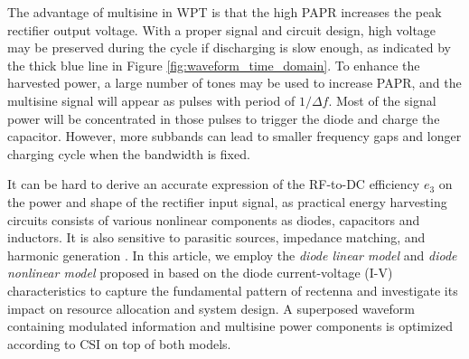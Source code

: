 The advantage of multisine in WPT is that the high PAPR increases the peak rectifier output voltage. With a proper signal and circuit design, high voltage may be preserved during the cycle if discharging is slow enough, as indicated by the thick blue line in Figure \ref{fig:waveform_time_domain}. To enhance the harvested power, a large number of tones may be used to increase PAPR, and the multisine signal will appear as pulses with period of $1/\Delta f$. Most of the signal power will be concentrated in those pulses to trigger the diode and charge the capacitor. However, more subbands can lead to smaller frequency gaps and longer charging cycle when the bandwidth is fixed.

It can be hard to derive an accurate expression of the RF-to-DC efficiency ${e_3}$ on the power and shape of the rectifier input signal, as practical energy harvesting circuits consists of various nonlinear components as diodes, capacitors and inductors. It is also sensitive to parasitic sources, impedance matching, and harmonic generation \cite{Strassner2013, Valenta2014}. In this article, we employ the \textit{diode linear model} and \textit{diode nonlinear model} proposed in \cite{Clerckx2016} based on the diode current-voltage (I-V) characteristics to capture the fundamental pattern of rectenna and investigate its impact on resource allocation and system design. A superposed waveform containing modulated information and multisine power components is optimized according to CSI on top of both models.
